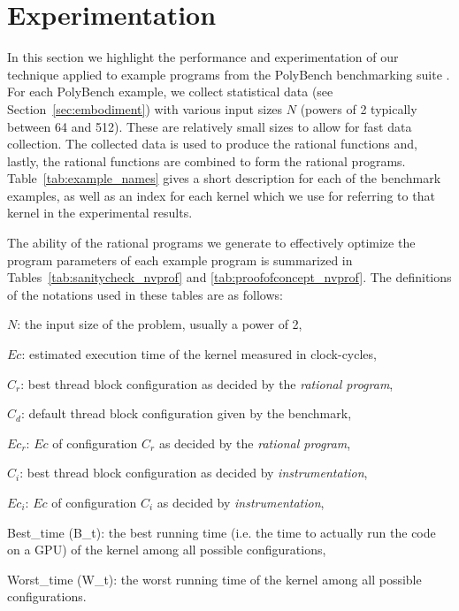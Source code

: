 
\chapter{Experimentation}
\label{ch:performance}



\iffalse 
In this section we highlight the performance and experimentation of
our technique applied to example {\cuda} programs
from the PolyBench benchmarking suite \cite{grauer2012auto}.
For each PolyBench example,
we collect statistical data (see Section~\ref{sec:embodiment}) with
various input sizes $N$ (powers of 2 typically between 64 and 512). 
These are relatively small sizes to allow for fast data collection.
The collected data is used 
to produce the rational functions and, lastly, the rational functions
are combined to form the rational programs.
Table~\ref{tab:example_names} gives a short description for
each of the benchmark examples, as well as an index for each kernel
which we use for referring to that kernel in the experimental results.

The ability of the rational programs we generate to effectively
optimize the program parameters of each example {\cuda} program is
summarized in Tables~\ref{tab:sanitycheck_nvprof}
and \ref{tab:proofofconcept_nvprof}. The definitions of the notations used
in these tables are as follows:
\begin{itemizeshort}
	\item $N$: the input size of the problem, usually a power of 2,
	\item $Ec$: estimated execution time of the kernel measured in clock-cycles,
	\item $C_r$: best thread block configuration as decided by the {\em rational program},
	\item $C_d$: default thread block configuration given by the benchmark,
	\item $Ec_r$: $Ec$ of configuration $C_r$ as decided by the {\em rational program},
	\item $C_i$: best thread block configuration as decided by \textit{instrumentation},
	\item $Ec_i$: $Ec$ of configuration $C_i$ as decided by \textit{instrumentation},
	\item {\rm Best\_time (B\_t)}: the best {\cuda} running time 
	(i.e. the time to actually run the code on a GPU) of the kernel among all possible configurations,
	\item {\rm Worst\_time (W\_t)}: the worst {\cuda} running time of the kernel among all possible configurations.
\end{itemizeshort}


